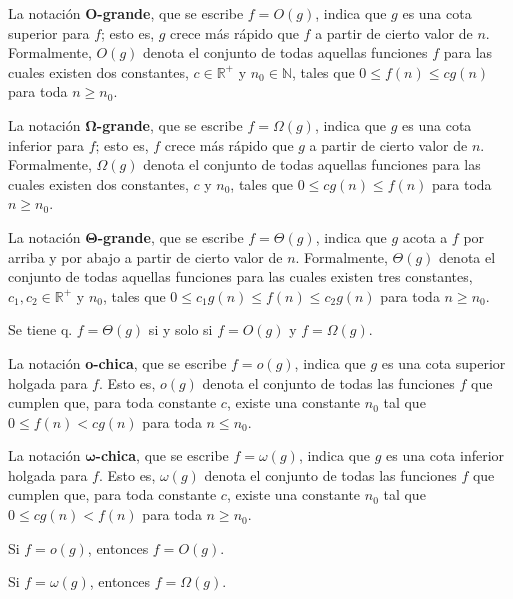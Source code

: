 La notación \textbf{O-grande}, que se escribe \(f=O(g)\), indica que \(g\) es una cota superior para \(f\); esto es, \(g\) crece más rápido que \(f\) a partir de cierto valor de \(n\).
Formalmente, \(O(g)\) denota el conjunto de todas aquellas funciones \(f\) para las cuales existen dos constantes, \(c\in\mathbb{R}^+\) y \(n_0\in\mathbb{N}\), tales que \(0\leq f(n)\leq cg(n)\) para toda \(n\geq n_0\). 

La notación \textbf{\(\boldsymbol{\Omega}\)-grande}, que se escribe \(f=\Omega(g)\), indica que \(g\) es una cota inferior para \(f\); esto es, \(f\) crece más rápido que \(g\) a partir de cierto valor de \(n\).
Formalmente, \(\Omega(g)\) denota el conjunto de todas aquellas funciones para las cuales existen dos constantes, \(c\) y \(n_0\), tales que \(0\leq cg(n)\leq f(n)\) para toda \(n\geq n_0\).

La notación \textbf{\(\boldsymbol{\Theta}\)-grande}, que se escribe \(f=\Theta(g)\), indica que \(g\) acota a \(f\) por arriba y por abajo a partir de cierto valor de \(n\).
Formalmente, \(\Theta(g)\) denota el conjunto de todas aquellas funciones para las cuales existen tres constantes, \(c_1,c_2\in\mathbb{R}^+\) y \(n_0\), tales que \(0\leq c_1 g(n)\leq f(n)\leq c_2 g(n)\) para toda \(n\geq n_0\).

\begin{prop}
  Se tiene q. \(f=\Theta(g)\) si y solo si \(f=O(g)\) y \(f=\Omega(g)\).
\end{prop}

La notación \textbf{o-chica}, que se escribe \(f=o(g)\), indica que \(g\) es una cota superior holgada para \(f\).
Esto es, \(o(g)\) denota el conjunto de todas las funciones \(f\) que cumplen que, para toda constante \(c\), existe una constante \(n_0\) tal que \(0\leq f(n)<cg(n)\) para toda \(n\leq n_0\).

La notación \textbf{\(\boldsymbol{\omega}\)-chica}, que se escribe \(f=\omega(g)\), indica que \(g\) es una cota inferior holgada para \(f\).
Esto es, \(\omega(g)\) denota el conjunto de todas las funciones \(f\) que cumplen que, para toda constante \(c\), existe una constante \(n_0\) tal que \(0\leq cg(n)<f(n)\) para toda \(n\geq n_0\).

\begin{prop}
  Si \(f=o(g)\), entonces \(f=O(g)\).
\end{prop}

\begin{prop}
  Si \(f=\omega(g)\), entonces \(f=\Omega(g)\).
\end{prop}

